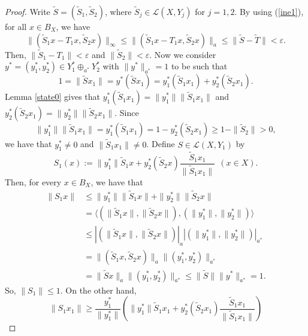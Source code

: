 \documentclass[10pt,a4paper]{amsart}
\theoremstyle{plain}
\theoremstyle{definition}
\newcommand{\eps}{\varepsilon}
\renewcommand{\leq}{\leqslant}
\renewcommand{\geq}{\geqslant}
\begin{document}
\begin{proof}
Write $\widetilde{S} = (\widetilde{S}_1, \widetilde{S}_2)$, where $\widetilde{S}_j \in \mathcal{L}(X, Y_j)$ for $j = 1, 2$. By using (\ref{ine1}), for all $x \in B_X$, we have
\begin{equation*}
\|(\widetilde{S}_1x - T_1x, \widetilde{S}_2x)\|_{\infty} \leq \|(\widetilde{S}_1x - T_1x, \widetilde{S}_2x)\|_a \leq \|\widetilde{S} - \widetilde{T}\| < \eps.
\end{equation*}
Then, $\|\widetilde{S}_1 - T_1\| < \eps$ and $\|\widetilde{S}_2\| < \eps$. Now we consider $y^* = (y_1^*, y_2^*) \in Y_1^* \oplus_{a^*} Y_2^*$ with $\|y^*\|_{a^*} = 1$ to be such that
\begin{equation*}
1 = \|\widetilde{S}x_1\| = y^*(\widetilde{S}x_1) = y_1^* (\widetilde{S}_1x_1) + y_2^* (\widetilde{S}_2x_1).
\end{equation*}
Lemma \ref{state0} gives that $y_1^* (\widetilde{S}_1x_1) = \|y_1^*\| \|\widetilde{S}_1 x_1\|$ and $y_2^* (\widetilde{S}_2x_1) = \|y_2^*\| \|\widetilde{S}_2 x_1\|$. Since
\begin{equation*}
\|y_1^*\| \| \widetilde{S}_1x_1\| =  y_1^*(\widetilde{S}_1 x_1) = 1 -  y_2^*(\widetilde{S}_2 x_1) \geq 1 - \|\widetilde{S}_2\| > 0,
\end{equation*}
we have that $y_1^* \not= 0$ and $\|\widetilde{S}_1 x_1\| \not= 0$. Define $S \in \mathcal{L}(X, Y_1)$ by
\begin{equation}\label{eq:S1}
S_1(x) := \|y_1^*\| \widetilde{S}_1x + y_2^* (\widetilde{S}_2x) \frac{\widetilde{S}_1x_1}{\|\widetilde{S}_1x_1\|} \ \ (x  \in X).
\end{equation}
Then, for every $x \in B_X$, we have that
\begin{align*}
\|S_1x\| &\leq \|y_1^*\|\|\widetilde{S}_1x\| + \|y_2^*\|\|\widetilde{S}_2x\| \\
&= \langle ( \| \widetilde{S}_1x\|, \|\widetilde{S}_2x\|), ( \|y_1^*\|, \|y_2^*\|) \rangle \\
&\leq | ( \| \widetilde{S}_1x\|, \| \widetilde{S}_2x\|)|_a | (\|y_1^*\|, \|y_2^*\|)|_{a^*} \\
&= \| (\widetilde{S}_1x, \widetilde{S}_2x)\|_a \|(y_1^*, y_2^*)\|_{a^*} \\
&= \|\widetilde{S}x\|_a \|(y_1^*, y_2^*)\|_{a^*} \leq \|\widetilde{S}\| \|y^*\|_{a^*} = 1.
\end{align*}
So, $\|S_1\| \leq 1$. On the other hand,
\begin{equation*}
\|S_1x_1\| \geq \frac{y_1^*}{\|y_1^*\|} \left(\|y_1^*\| \widetilde{S}_1x_1 + y_2^*(\widetilde{S}_2x_1) \frac{\widetilde{S}_1x_1}{\|\widetilde{S}_1x_1\|} \right)

\end{equation*}
\end{proof}
\end{document}
